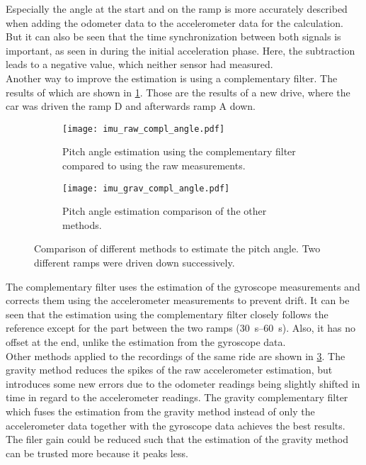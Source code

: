 Especially the angle at the start and on the ramp is more accurately described when adding the odometer data to the accelerometer data for the calculation.
But it can also be seen that the time synchronization between both signals is important, as seen in during the initial acceleration phase.
Here, the subtraction leads to a negative value, which neither sensor had measured.\\
Another way to improve the estimation is using a complementary filter.
The results of which are shown in \cref{fig:imu_raw_compl_angle}.
Those are the results of a new drive, where the car was driven the ramp D and afterwards ramp A down.
\begin{figure}[htb]
	\centering
	\begin{subfigure}{1\textwidth}
		\centering
		\texttt{[image: imu\_raw\_compl\_angle.pdf]}
		\caption{Pitch angle estimation using the complementary filter compared to using the raw measurements.}
		\label{fig:imu_raw_compl_angle}
	\end{subfigure}
	
	\begin{subfigure}{1\textwidth}
		\centering
		\texttt{[image: imu\_grav\_compl\_angle.pdf]}
		\caption{Pitch angle estimation comparison of the other methods.}
		\label{fig:imu_grav_compl_angle}
	\end{subfigure}
	\caption{Comparison of different methods to estimate the pitch angle. Two different ramps were driven down successively.}
\end{figure}
The complementary filter uses the estimation of the gyroscope measurements and corrects them using the accelerometer measurements to prevent drift.
It can be seen that the estimation using the complementary filter closely follows the reference except for the part between the two ramps (\SIrange{30}{60}{\second}).
Also, it has no offset at the end, unlike the estimation from the gyroscope data.\\
Other methods applied to the recordings of the same ride are shown in \cref{fig:imu_grav_compl_angle}.
The gravity method reduces the spikes of the raw accelerometer estimation, but introduces some new errors due to the odometer readings being slightly shifted in time in regard to the accelerometer readings.
The gravity complementary filter which fuses the estimation from the gravity method instead of only the accelerometer data together with the gyroscope data achieves the best results.
The filer gain could be reduced such that the estimation of the gravity method can be trusted more because it peaks less.

